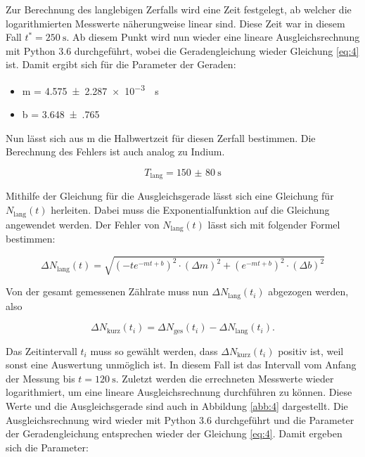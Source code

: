 Zur Berechnung des langlebigen Zerfalls wird eine Zeit festgelegt, ab welcher die
logarithmierten Messwerte näherungweise linear sind. Diese Zeit war in diesem Fall
$t^* = \SI{250}{\second}$. Ab diesem Punkt wird nun wieder eine lineare Ausgleichsrechnung
mit Python 3.6 durchgeführt, wobei die Geradengleichung wieder Gleichung \ref{eq:4}
ist. Damit ergibt sich für die Parameter der Geraden:

\begin{itemize}
  \item m = \SI{4.575(2287)e-3}{\per\second}
  \item b = \num{3.648(765)}
\end{itemize}

Nun lässt sich aus m die Halbwertzeit für diesen Zerfall bestimmen. Die Berechnung
des Fehlers ist auch analog zu Indium.

\begin{equation*}
  T_\text{lang} = \SI{150(80)}{\second}
\end{equation*}

Mithilfe der Gleichung für die Ausgleichsgerade lässt sich eine Gleichung für
$N_\text{lang}(t)$ herleiten. Dabei muss die Exponentialfunktion auf die Gleichung
angewendet werden. Der Fehler von $N_\text{lang}(t)$ lässt sich mit folgender
Formel bestimmen:

\begin{equation*}
  \Delta N_\text{lang}(t) = \sqrt{\left(-te^{-mt+b}\right)^2 \cdot (\Delta m)^2 +
  \left(e^{-mt+b}\right)^2 \cdot (\Delta b)^2}
\end{equation*}

Von der gesamt gemessenen Zählrate muss nun $\Delta N_\text{lang}(t_i)$ abgezogen
werden, also

\begin{equation*}
\Delta N_\text{kurz}(t_i) = \Delta N_\text{ges}(t_i) - \Delta N_\text{lang}(t_i).
\end{equation*}

Das Zeitintervall $t_i$ muss so gewählt werden, dass $\Delta N_\text{kurz}(t_i)$
positiv ist, weil sonst eine Auswertung unmöglich ist. In diesem Fall ist das
Intervall vom Anfang der Messung bis $t = \SI{120}{\second}$.
Zuletzt werden die errechneten Messwerte wieder logarithmiert, um eine lineare
Ausgleichsrechnung durchführen zu können. Diese Werte und die Ausgleichsgerade sind
auch in Abbildung \ref{abb:4} dargestellt. Die Ausgleichsrechnung wird wieder mit
Python 3.6 durchgeführt und die Parameter der Geradengleichung entsprechen wieder der
Gleichung \ref{eq:4}. Damit ergeben sich die Parameter:

